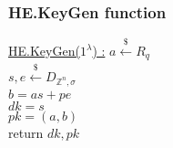 \subsubsection{HE.KeyGen function}
\underline{HE.KeyGen($1^\lambda$) :} 
\tabNormal $a \xleftarrow[]{\$}R_q$ \\
\tabNormal $s,e \xleftarrow[]{\$}D_{\mathbb{Z}^n, \sigma}$ \\
\tabNormal $b = a s + p e $ \\
\tabNormal $dk = s$ \\
\tabNormal $pk = (a,b) $ \\
\tabNormal return $dk, pk$  \\
